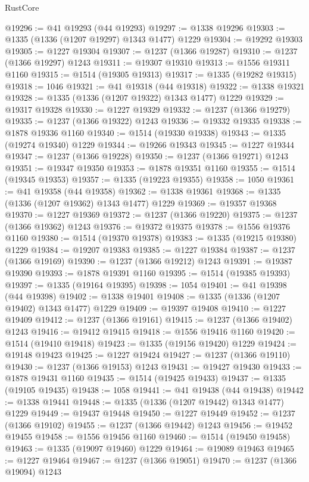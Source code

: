 \begin{lexlean}{RustCore}
\begin{coremodule}
@19296 := @41 @19293 (@44 @19293)
@19297 := @1338 @19296
@19303 := @1335 (@1336 (@1207 @19297) @1343 @1477) @1229
@19304 := @19292 @19303
@19305 := @1227 @19304
@19307 := @1237 (@1366 @19287)
@19310 := @1237 (@1366 @19297) @1243
@19311 := @19307 @19310
@19313 := @1556 @19311 @1160
@19315 := @1514 (@19305 @19313)
@19317 := @1335 (@19282 @19315)
@19318 := 1046
@19321 := @41 @19318 (@44 @19318)
@19322 := @1338 @19321
@19328 := @1335 (@1336 (@1207 @19322) @1343 @1477) @1229
@19329 := @19317 @19328
@19330 := @1227 @19329
@19332 := @1237 (@1366 @19279)
@19335 := @1237 (@1366 @19322) @1243
@19336 := @19332 @19335
@19338 := @1878 @19336 @1160
@19340 := @1514 (@19330 @19338)
@19343 := @1335 (@19274 @19340) @1229
@19344 := @19266 @19343
@19345 := @1227 @19344
@19347 := @1237 (@1366 @19228)
@19350 := @1237 (@1366 @19271) @1243
@19351 := @19347 @19350
@19353 := @1878 @19351 @1160
@19355 := @1514 (@19345 @19353)
@19357 := @1335 (@19223 @19355)
@19358 := 1050
@19361 := @41 @19358 (@44 @19358)
@19362 := @1338 @19361
@19368 := @1335 (@1336 (@1207 @19362) @1343 @1477) @1229
@19369 := @19357 @19368
@19370 := @1227 @19369
@19372 := @1237 (@1366 @19220)
@19375 := @1237 (@1366 @19362) @1243
@19376 := @19372 @19375
@19378 := @1556 @19376 @1160
@19380 := @1514 (@19370 @19378)
@19383 := @1335 (@19215 @19380) @1229
@19384 := @19207 @19383
@19385 := @1227 @19384
@19387 := @1237 (@1366 @19169)
@19390 := @1237 (@1366 @19212) @1243
@19391 := @19387 @19390
@19393 := @1878 @19391 @1160
@19395 := @1514 (@19385 @19393)
@19397 := @1335 (@19164 @19395)
@19398 := 1054
@19401 := @41 @19398 (@44 @19398)
@19402 := @1338 @19401
@19408 := @1335 (@1336 (@1207 @19402) @1343 @1477) @1229
@19409 := @19397 @19408
@19410 := @1227 @19409
@19412 := @1237 (@1366 @19161)
@19415 := @1237 (@1366 @19402) @1243
@19416 := @19412 @19415
@19418 := @1556 @19416 @1160
@19420 := @1514 (@19410 @19418)
@19423 := @1335 (@19156 @19420) @1229
@19424 := @19148 @19423
@19425 := @1227 @19424
@19427 := @1237 (@1366 @19110)
@19430 := @1237 (@1366 @19153) @1243
@19431 := @19427 @19430
@19433 := @1878 @19431 @1160
@19435 := @1514 (@19425 @19433)
@19437 := @1335 (@19105 @19435)
@19438 := 1058
@19441 := @41 @19438 (@44 @19438)
@19442 := @1338 @19441
@19448 := @1335 (@1336 (@1207 @19442) @1343 @1477) @1229
@19449 := @19437 @19448
@19450 := @1227 @19449
@19452 := @1237 (@1366 @19102)
@19455 := @1237 (@1366 @19442) @1243
@19456 := @19452 @19455
@19458 := @1556 @19456 @1160
@19460 := @1514 (@19450 @19458)
@19463 := @1335 (@19097 @19460) @1229
@19464 := @19089 @19463
@19465 := @1227 @19464
@19467 := @1237 (@1366 @19051)
@19470 := @1237 (@1366 @19094) @1243

\end{coremodule}
\end{lexlean}
